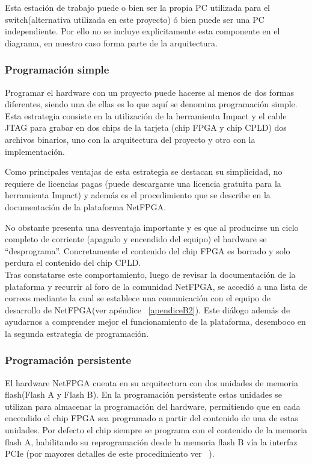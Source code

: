 Esta estaci\'on de trabajo puede o bien ser la propia PC utilizada para el switch(alternativa utilizada en este proyecto) \'o bien puede ser una PC independiente. Por ello no se incluye explicitamente esta componente en el diagrama, en nuestro caso forma parte de la arquitectura.


\subsubsection{Programaci\'on simple}
Programar el hardware con un proyecto puede hacerse al menos de dos formas diferentes, siendo una de ellas es lo que aqu\'i se denomina programaci\'on simple. Esta estrategia consiste en la utilizaci\'on de la herramienta Impact y el cable JTAG para grabar en dos chips de la tarjeta (chip FPGA y chip CPLD) dos archivos binarios, uno con la arquitectura del proyecto y otro con la implementaci\'on.

Como principales ventajas de esta estrategia se destacan su simplicidad, no requiere de licencias pagas (puede descargarse una licencia gratuita para la herramienta Impact) y adem\'as es el procedimiento que se describe en la documentaci\'on de la plataforma NetFPGA.

No obstante presenta una desventaja importante y es que al producirse un ciclo completo de corriente (apagado y encendido del equipo) el hardware se “desprograma”. Concretamente el contenido del chip FPGA es borrado y solo perdura el contenido del chip CPLD.\\

Tras constatarse este comportamiento, luego de revisar la documentaci\'on de la plataforma y recurrir al foro de la comunidad NetFPGA, se accedió a una lista de correos mediante la cual se establece una comunicaci\'on con el equipo de desarrollo de NetFPGA(ver ap\'endice ~\ref{apendiceB2}). Este di\'alogo adem\'as de ayudarnos a comprender mejor el funcionamiento de la plataforma, desemboco en la segunda estrategia de programaci\'on.

\subsubsection{Programaci\'on persistente}
El hardware NetFPGA cuenta en su arquitectura con dos unidades de memoria flash(Flash A y Flash B). En la programaci\'on persistente estas unidades se utilizan para almacenar la programaci\'on del hardware, permitiendo que en cada encendido el chip FPGA sea programado a partir del contenido de una de estas unidades. Por defecto el chip siempre se programa con el contenido de la memoria flash A, habilitando su reprogramaci\'on desde la memoria flash B v\'ia la interfaz PCIe (por mayores detalles de este procedimiento ver ~\citep{PCIEProgProject}).\\

